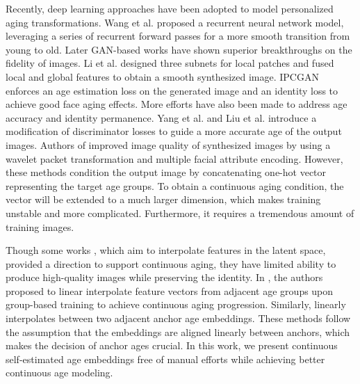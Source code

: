 \documentclass[final]{cvpr}
\begin{document}
Recently, deep learning approaches have been adopted to model personalized aging transformations. Wang et al. \cite{wang2016recurrent} proposed a recurrent neural network model, leveraging a series of recurrent forward passes for a more smooth transition from young to old. Later GAN-based works \cite{li2018global,wang2018face,yang2018learning} have shown superior breakthroughs on the fidelity of images. Li et al. \cite{li2018global} designed three subnets for local patches and fused local and global features to obtain a smooth synthesized image. IPCGAN \cite{wang2018face} enforces an age estimation loss on the generated image and an identity loss to achieve good face aging effects. More efforts have also been made to address age accuracy and identity permanence. Yang et al.\cite{yang2018learning} and Liu et al. \cite{liu2017face} introduce a modification of discriminator losses to guide a more accurate age of the output images. Authors of \cite{liu2019attribute} improved image quality of synthesized images by using a wavelet packet transformation and multiple facial attribute encoding. However, these methods \cite{wang2018face,yang2018learning,liu2017face} condition the output image by concatenating one-hot vector representing the target age groups. To obtain a continuous aging condition, the vector will be extended to a much larger dimension, which makes training unstable and more complicated. Furthermore, it requires a tremendous amount of training images.


Though some works \cite{zhang2017age,antipov2017face,shen2020interpreting}, which aim to interpolate features in the latent space, provided a direction to support continuous aging, they have limited ability to produce high-quality images while preserving the identity. In \cite{he2019s2gan}, the authors proposed to linear interpolate feature vectors from adjacent age groups upon group-based training to achieve continuous aging progression. Similarly, \cite{orel2020lifespan} linearly interpolates between two adjacent anchor age embeddings. These methods follow the assumption that the embeddings are aligned linearly between anchors, which makes the decision of anchor ages crucial. In this work, we present continuous self-estimated age embeddings free of manual efforts while achieving better continuous age modeling.
\end{document}
